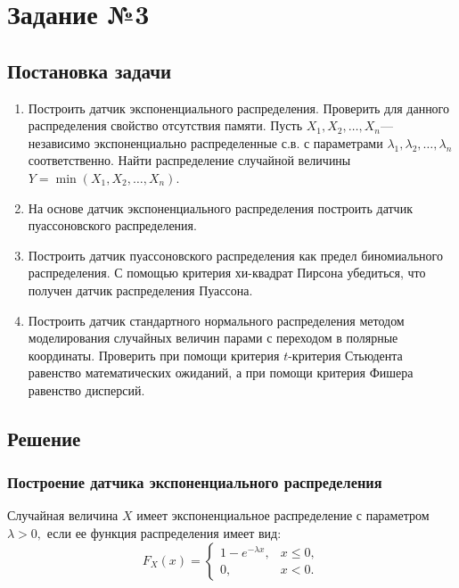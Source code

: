 \documentclass[11pt]{article}
\begin{document}
	\section{Задание №3}
	\subsection{Постановка задачи}
	\begin{enumerate}
		\item Построить датчик экспоненциального распределения. Проверить для данного распределения свойство отсутствия памяти. Пусть $X_1,X_2,\dots,X_n$--- независимо экспоненциально распределенные с.в. с параметрами $\lambda_1,\lambda_2,\dots, \lambda_n$ соответственно. Найти распределение случайной величины $Y = \min (X_1,X_2,\dots,X_n).$
		\item На основе датчик экспоненциального распределения построить датчик пуассоновского распределения.
		\item Построить датчик пуассоновского распределения как предел биномиального распределения. С помощью критерия хи-квадрат Пирсона убедиться, что получен датчик распределения Пуассона.
		\item Построить датчик стандартного нормального распределения методом моделирования случайных величин парами с переходом в полярные координаты. Проверить при помощи критерия $t$-критерия Стьюдента равенство математических ожиданий, а при помощи критерия Фишера равенство дисперсий.
	\end{enumerate}
	\subsection{Решение}
	\subsubsection{Построение датчика экспоненциального распределения}
	\begin{opr}
		Случайная величина $X$ имеет экспоненциальное распределение с параметром $\lambda > 0,$ если ее функция распределения имеет вид:
		\begin{equation}
		F_X(x) = \begin{cases}
		1- e^{-\lambda x}, & x \leq 0,\\
		0, & x < 0.
		\end{cases}
		\end{equation}
	\end{opr}
	
\end{document}
